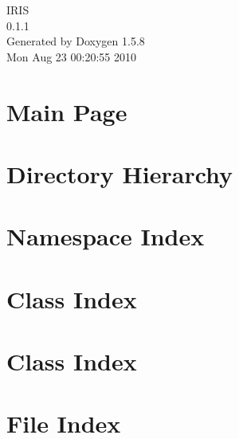\documentclass[a4paper]{book}
\begin{document}
\begin{titlepage}
\vspace*{7cm}
\begin{center}
{\Large IRIS \\[1ex]\large 0.1.1 }\\
\vspace*{1cm}
{\large Generated by Doxygen 1.5.8}\\
\vspace*{0.5cm}
{\small Mon Aug 23 00:20:55 2010}\\
\end{center}
\end{titlepage}
\clearemptydoublepage
{}
\tableofcontents
\clearemptydoublepage
{}
\chapter{Main Page}
\label{index}
\chapter{Directory Hierarchy}

\chapter{Namespace Index}

\chapter{Class Index}

\chapter{Class Index}

\chapter{File Index}

\end{document}
